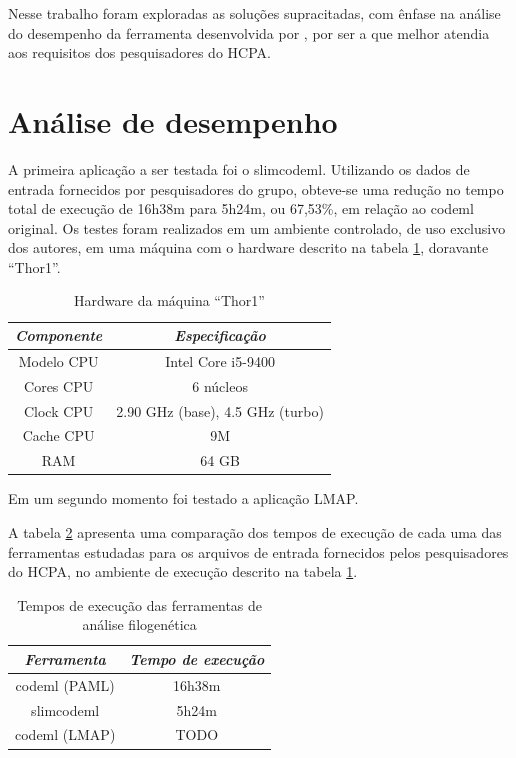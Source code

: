 \documentclass[cic,tc]{iiufrgs}
\begin{document}
Nesse trabalho foram exploradas as soluções supracitadas, com ênfase na análise
do desempenho da ferramenta desenvolvida por \cite{schabauer2012slimcodeml},
por ser a que melhor atendia aos requisitos dos pesquisadores do HCPA.

\section{Análise de desempenho}

A primeira aplicação a ser testada foi o
slimcodeml.\cite{schabauer2012slimcodeml} Utilizando os dados de entrada
fornecidos por pesquisadores do grupo, obteve-se uma redução no tempo total de
execução de 16h38m para 5h24m, ou 67,53\%, em relação ao codeml original. Os
testes foram realizados em um ambiente controlado, de uso exclusivo dos
autores, em uma máquina com o hardware descrito na tabela \ref{tbl:thor1},
doravante ``Thor1''.

\begin{table}[h]
    \caption{Hardware da máquina ``Thor1''}
    \centering
        \begin{tabular}{c|c}
          \hline
          \textit{Componente}  &   \textit{Especificação} \\
          \hline
          \hline
          Modelo CPU & Intel Core i5-9400 \\
          Cores CPU & 6 núcleos\\
          Clock CPU & 2.90 GHz (base), 4.5 GHz (turbo) \\
          Cache CPU & 9M \\
          RAM & 64 GB \\
          \hline
        \end{tabular}
    \label{tbl:thor1}
\end{table}

Em um segundo momento foi testado a aplicação LMAP.\cite{maldonado2016lmap}

A tabela \ref{tbl:paml} apresenta uma comparação dos tempos de execução de cada
uma das ferramentas estudadas para os arquivos de entrada fornecidos pelos
pesquisadores do HCPA, no ambiente de execução descrito na tabela \ref{tbl:thor1}.

\begin{table}[h]
    \caption{Tempos de execução das ferramentas de análise filogenética}
    \centering
        \begin{tabular}{c|c}
          \hline
          \textit{Ferramenta}  &   \textit{Tempo de execução} \\
          \hline
          \hline
          codeml (PAML) & 16h38m \\
          slimcodeml & 5h24m \\
          codeml (LMAP) & TODO \\
          \hline
        \end{tabular}
    \label{tbl:paml}
\end{table}
\end{document}
